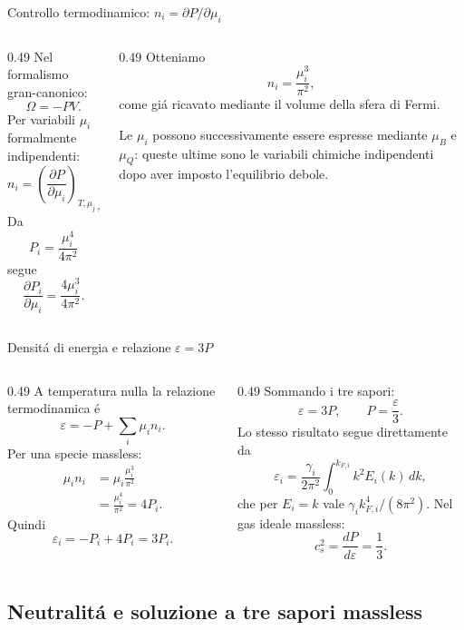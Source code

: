 \begin{frame}[t]{Controllo termodinamico: $n_i=\partial P/\partial\mu_i$}
\small
\begin{columns}[T,onlytextwidth]
\begin{column}{0.49\textwidth}
Nel formalismo gran-canonico:
\[
\Omega=-PV.
\]
Per variabili $\mu_i$ formalmente indipendenti:
\[
n_i=\left(\frac{\partial P}{\partial\mu_i}\right)_{T,\mu_{j\ne i}}.
\]
Da
\[
P_i=\frac{\mu_i^4}{4\pi^2}
\]
segue
\[
\frac{\partial P_i}{\partial\mu_i}
=\frac{4\mu_i^3}{4\pi^2}.
\]
\end{column}
\begin{column}{0.49\textwidth}
Otteniamo
\[
\boxed{n_i=\frac{\mu_i^3}{\pi^2}},
\]
come gi\'a ricavato mediante il volume della sfera di Fermi.

Le $\mu_i$ possono successivamente essere espresse mediante $\mu_B$ e $\mu_Q$: queste ultime sono le variabili chimiche indipendenti dopo aver imposto l'equilibrio debole.
\end{column}
\end{columns}
\end{frame}

\begin{frame}[t]{Densit\'a di energia e relazione $\varepsilon=3P$}
\small
\begin{columns}[T,onlytextwidth]
\begin{column}{0.49\textwidth}
A temperatura nulla la relazione termodinamica \'e
\[
\varepsilon=-P+\sum_i\mu_i n_i.
\]
Per una specie massless:
\[
\begin{aligned}
\mu_i n_i&=\mu_i\frac{\mu_i^3}{\pi^2}\\
&=\frac{\mu_i^4}{\pi^2}=4P_i.
\end{aligned}
\]
Quindi
\[
\varepsilon_i=-P_i+4P_i=3P_i.
\]
\end{column}
\begin{column}{0.49\textwidth}
Sommando i tre sapori:
\[
\boxed{\varepsilon=3P},
\qquad
\boxed{P=\frac\varepsilon3}.
\]
Lo stesso risultato segue direttamente da
\[
\varepsilon_i=\frac{\gamma_i}{2\pi^2}
\int_0^{k_{F,i}}k^2E_i(k)\,dk,
\]
che per $E_i=k$ vale $\gamma_i k_{F,i}^4/(8\pi^2)$.
\medskip
Nel gas ideale massless:
\[
c_s^2=\frac{dP}{d\varepsilon}=\frac13.
\]
\end{column}
\end{columns}
\end{frame}

\subsection{Neutralit\'a e soluzione a tre sapori massless}

